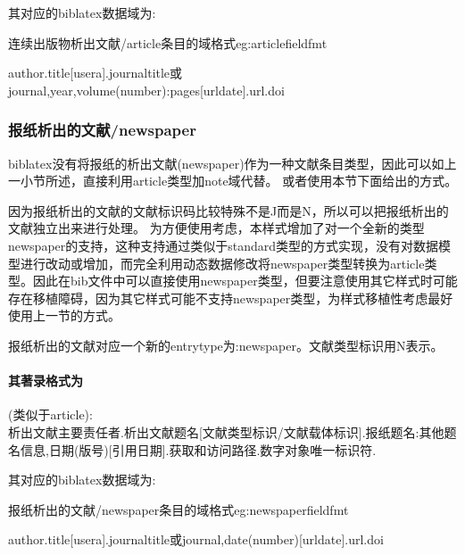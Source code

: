 其对应的biblatex数据域为:
\begin{example}{连续出版物析出文献/article条目的域格式}{eg:articlefieldfmt}
\begin{texlist}
author.title[usera].journaltitle或journal,year,volume(number):pages[urldate].url.doi
\end{texlist}
\end{example}


\subsubsection{报纸析出的文献/newspaper}\label{sec:standard}
biblatex没有将报纸的析出文献(newspaper)作为一种文献条目类型，因此可以如上一小节所述，直接利用article类型加note域代替。
或者使用本节下面给出的方式。

因为报纸析出的文献的文献标识码比较特殊不是J而是N，所以可以把报纸析出的文献独立出来进行处理。
为方便使用考虑，本样式增加了对一个全新的类型newspaper的支持，这种支持通过类似于standard类型的方式实现，没有对数据模型进行改动或增加，而完全利用动态数据修改将newspaper类型转换为article类型。因此在bib文件中可以直接使用newspaper类型，但要注意使用其它样式时可能存在移植障碍，因为其它样式可能不支持newspaper类型，为样式移植性考虑最好使用上一节的方式。

\begin{refentry}{}{}
报纸析出的文献对应一个新的entrytype为:newspaper。文献类型标识用N表示。

\paragraph{其著录格式为}(类似于article):\\
析出文献主要责任者.析出文献题名[文献类型标识/文献载体标识].报纸题名:其他题名信息,日期(版号)[引用日期].获取和访问路径.数字对象唯一标识符.
\end{refentry}

其对应的biblatex数据域为:
\begin{example}{报纸析出的文献/newspaper条目的域格式}{eg:newspaperfieldfmt}
\begin{texlist}
author.title[usera].journaltitle或journal,date(number)[urldate].url.doi
\end{texlist}
\end{example}

